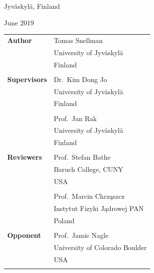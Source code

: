 \centerline{Jyv\"askyl\"a, Finland}
\centerline{June 2019}

\pagebreak
\thispagestyle{empty}

\vspace*{25mm} 

\begin{table}[h!]
  \begin{tabular}{ p{4cm}  p{6cm} }
  {\bf Author} 	& {Tomas Snellman}\\  
  {} 			& {University of Jyv\"askyl\"a}\\  
  {} 			& {Finland}\\  
  {} 			& {}\\  

  {\bf Supervisors} 	& {Dr.~Kim Dong Jo}\\  
  {} 				& {University of Jyv\"askyl\"a}\\  
  {} 				& {Finland}\\  
  {} 				& {}\\  

  {}			 	& {Prof.~Jan Rak}\\  
  {} 				& {University of Jyv\"askyl\"a}\\  
  {} 				& {Finland}\\  
  {} 				& {}\\  

  {\bf Reviewers} 	& {Prof.~Stefan Bathe}\\  
  {} 				& {Baruch College, CUNY}\\  
  {} 				& {USA}\\  
  {} 				& {}\\  

  {}			 	& {Prof.~Marcin Chrząszcz}\\  
  {} 				& {Instytut Fizyki Jądrowej PAN}\\  
  {} 				& {Poland}\\  
  {} 				& {}\\  
    
  {\bf Opponent} 	& {Prof.~Jamie Nagle}\\  
  {} 				& {University of Colorado Boulder}\\  
  {} 				& {USA}\\  
  {} 				& {}\\  

  \end{tabular}
  \label{}
\end{table}
